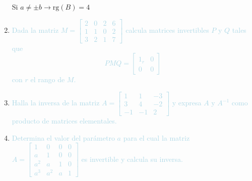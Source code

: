 \begin{enumerate}[label=\color{red}\textbf{\arabic*)},leftmargin=*]
	Si $a\neq\pm b\longrightarrow\mathrm{rg}(B)=4$
	\item \textcolor{lightblue}{Dada la matriz $M=\begin{bmatrix}
			2  & 0 & 2 & 6\\
			1 & 1 & 0 & 2\\
			3 & 2 & 1 & 7
		\end{bmatrix}$ calcula matrices invertibles $P$ y $Q$ tales que \[ PMQ=\left[\begin{array}{c|c}
		1_r & 0\\ \hline
		0 & 0
		\end{array}\right] \] con $r$ el rango de $M$.}
	\item \textcolor{lightblue}{Halla la inversa de la matriz $A=\begin{bmatrix}
			1 & 1 & -3 \\
			3 & 4 & -2 \\
			-1 & -1 & 2
		\end{bmatrix}$ y expresa $A$ y $A^{-1}$ como producto de matrices elementales.}
	\item \textcolor{lightblue}{Determina el valor del parámetro $a$ para el cual la matriz $A=\begin{bmatrix}
			1 & 0 & 0 & 0 \\
			a & 1 & 0 & 0 \\
			a^2 & a & 1 & 0 \\
			a^3 & a^2 & a & 1
		\end{bmatrix}$ es invertible y calcula su inversa.}
	

\end{enumerate}
